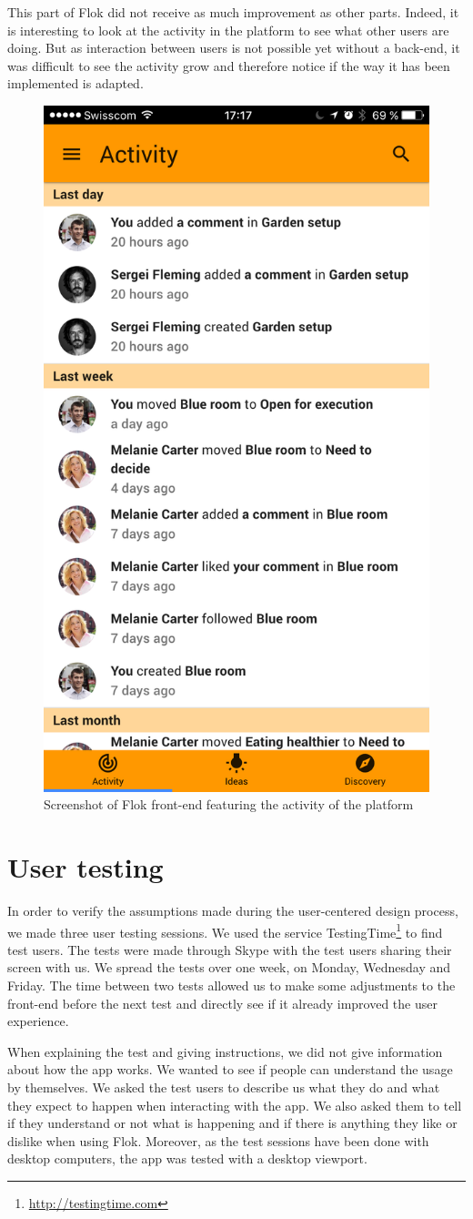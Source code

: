 \documentclass[a4paper,12pt,twoside]{article}
\begin{document}
This part of Flok did not receive as much improvement as other parts.
Indeed, it is interesting to look at the activity in the platform to see what other users are doing.
But as interaction between users is not possible yet without a back-end, it was difficult to see the activity grow and therefore notice if the way it has been implemented is adapted.

\begin{figure}[!htb]
    \centering
    \includegraphics[width=.32\textwidth]{images/activity.png}
    \caption{Screenshot of Flok front-end featuring the activity of the platform}
    \label{fig.activity}
\end{figure}

\section{User testing}
In order to verify the assumptions made during the user-centered design process, we made three user testing sessions.
We used the service TestingTime\footnote{\url{http://testingtime.com}} to find test users.
The tests were made through Skype with the test users sharing their screen with us.
We spread the tests over one week, on Monday, Wednesday and Friday.
The time between two tests allowed us to make some adjustments to the front-end before the next test and directly see if it already improved the user experience.

When explaining the test and giving instructions, we did not give information about how the app works.
We wanted to see if people can understand the usage by themselves.
We asked the test users to describe us what they do and what they expect to happen when interacting with the app.
We also asked them to tell if they understand or not what is happening and if there is anything they like or dislike when using Flok.
Moreover, as the test sessions have been done with desktop computers, the app was tested with a desktop viewport.
\end{document}
